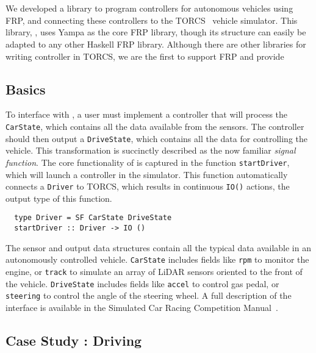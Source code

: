 \section{\ourLib}

We developed a library to program controllers for autonomous vehicles using FRP, and connecting these controllers to the TORCS~\cite{torcs} vehicle simulator.
This library, \mbox{\ourLib}, uses Yampa as the core FRP library, though its structure can easily be adapted to any other Haskell FRP library.
Although there are other libraries for writing controller in TORCS, we are the first to support FRP and provide

\subsection{Basics}

To interface with \ourLib, a user must implement a controller that will process the \texttt{CarState}, which contains all the data available from the sensors.
The controller should then output a \texttt{DriveState}, which contains all the data for controlling the vehicle.
This transformation is succinctly described as the now familiar \textit{signal function}.
The core functionality of \ourLib is captured in the function \texttt{startDriver}, which will launch a controller in the simulator.
This function automatically connects a \texttt{Driver} to TORCS, which results in continuous \texttt{IO()} actions, the output type of this function.

\vspace{0.2em}
\begin{lstlisting}
  type Driver = SF CarState DriveState
  startDriver :: Driver -> IO ()
\end{lstlisting}
\vspace{0.2em}

\noindent The sensor and output data structures contain all the typical data available in an autonomously controlled vehicle.
\texttt{CarState} includes fields like \texttt{rpm} to monitor the engine, or \texttt{track} to simulate an array of LiDAR sensors oriented to the front of the vehicle.
\texttt{DriveState} includes fields like \texttt{accel} to control gas pedal, or \texttt{steering} to control the angle of the steering wheel.
A full description of the interface is available in the Simulated Car Racing Competition Manual~\cite{SCRCManual}. 

\subsection{Case Study : Driving}

